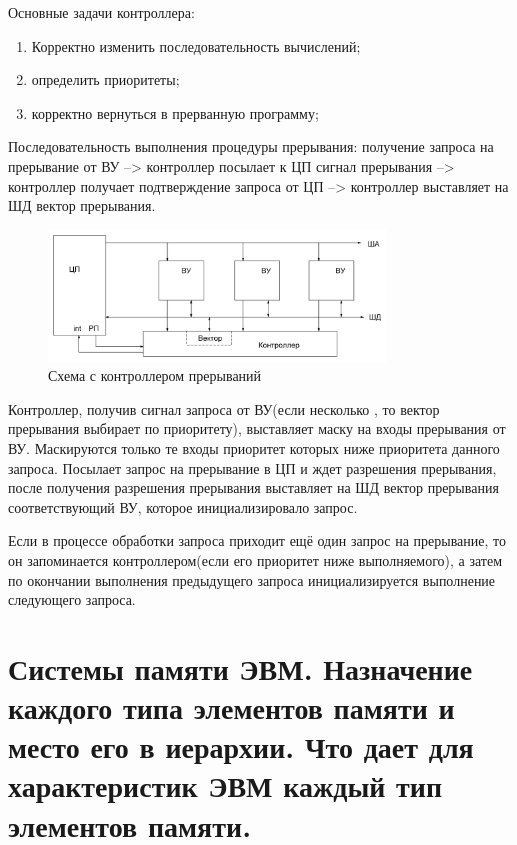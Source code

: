 \documentclass[unicode, 12pt, a4paper, oneside]{article}
\begin{document}
\begin{enumerate}
Основные задачи контроллера:
\begin{enumerate}
\item Корректно изменить последовательность вычислений;
\item определить приоритеты;
\item корректно вернуться в прерванную программу;
\end{enumerate}

Последовательность выполнения процедуры прерывания: получение запроса на прерывание от ВУ --> контроллер посылает к ЦП сигнал  прерывания --> контроллер получает подтверждение запроса от ЦП --> контроллер выставляет на ШД вектор прерывания.
\begin{figure}[H]
\centering
\includegraphics[width=0.8\textwidth]{112_Kontroller.JPG}
\caption{Схема с контроллером прерываний}
\end{figure}

Контроллер, получив сигнал запроса от ВУ(если несколько , то вектор прерывания выбирает по приоритету), выставляет маску на входы прерывания от ВУ. Маскируются только те входы приоритет которых ниже приоритета данного запроса. Посылает запрос на прерывание в ЦП и ждет разрешения прерывания, после получения разрешения прерывания выставляет на ШД вектор прерывания соответствующий ВУ, которое инициализировало запрос.

Если в процессе обработки запроса приходит ещё один запрос на прерывание, то он запоминается контроллером(если его приоритет ниже выполняемого), а затем по окончании выполнения предыдущего запроса инициализируется выполнение следующего запроса.
\end{enumerate}	

\section{Системы памяти ЭВМ. Назначение каждого типа элементов памяти и место его в иерархии. Что дает для характеристик ЭВМ каждый тип элементов памяти.}
\end{document}

